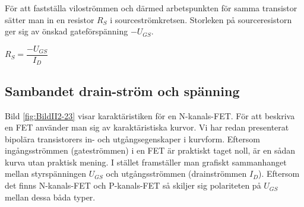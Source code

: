 För att fastställa viloströmmen och därmed arbetspunkten för samma transistor sätter man in en resistor \(R_S\) i sourceströmkretsen.
Storleken på sourceresistorn ger sig av önskad gateförspänning \(-U_{GS}\).

\(R_S = \dfrac{-U_{GS}}{I_D}\)

\subsection{Sambandet drain-ström och spänning}



Bild \ref{fig:BildII2-23} visar karaktäristiken för en N-kanals-FET.
För att beskriva en FET använder man sig av karaktäristiska kurvor.
Vi har redan presenterat bipolära transistorers in- och utgångsegenskaper i kurvform.
Eftersom ingångsströmmen (gateströmmen) i en FET är praktiskt taget noll, är en sådan kurva utan praktisk mening.
I stället framställer man grafiskt sammanhanget mellan styrspänningen
\(U_{GS}\) och utgångsströmmen (drainströmmen \(I_D\)).
Eftersom det finns N-kanals-FET och P-kanals-FET så skiljer sig polariteten på \(U_{GS}\) mellan dessa båda typer.

